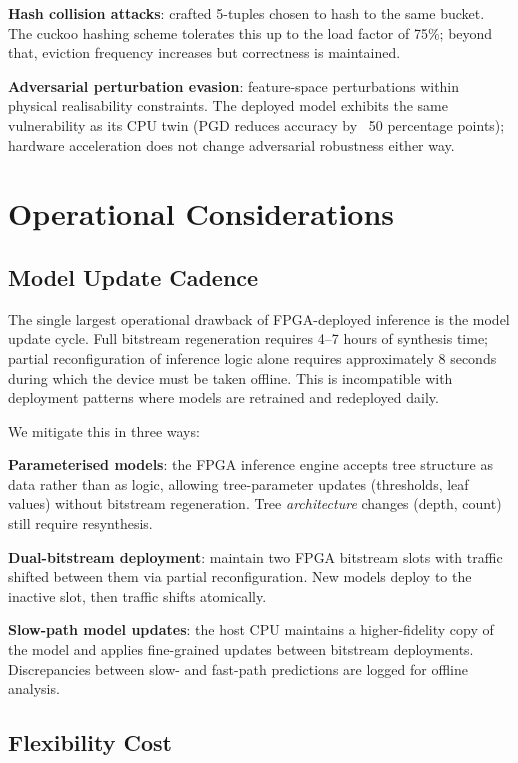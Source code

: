 \documentclass[sigconf,nonacm]{acmart}
\begin{document}
\textbf{Hash collision attacks}: crafted 5-tuples chosen to hash to
the same bucket. The cuckoo hashing scheme tolerates this up to the
load factor of 75\%; beyond that, eviction frequency increases but
correctness is maintained.

\textbf{Adversarial perturbation evasion}: feature-space perturbations
within physical realisability constraints. The deployed model exhibits
the same vulnerability as its CPU twin (PGD reduces accuracy by ~50
percentage points); hardware acceleration does not change adversarial
robustness either way.

\section{Operational Considerations}

\subsection{Model Update Cadence}

The single largest operational drawback of FPGA-deployed inference is
the model update cycle. Full bitstream regeneration requires 4--7 hours
of synthesis time; partial reconfiguration of inference logic alone
requires approximately 8 seconds during which the device must be taken
offline. This is incompatible with deployment patterns where models
are retrained and redeployed daily.

We mitigate this in three ways:

\textbf{Parameterised models}: the FPGA inference engine accepts tree
structure as data rather than as logic, allowing tree-parameter updates
(thresholds, leaf values) without bitstream regeneration. Tree
\emph{architecture} changes (depth, count) still require resynthesis.

\textbf{Dual-bitstream deployment}: maintain two FPGA bitstream slots
with traffic shifted between them via partial reconfiguration. New
models deploy to the inactive slot, then traffic shifts atomically.

\textbf{Slow-path model updates}: the host CPU maintains a higher-fidelity
copy of the model and applies fine-grained updates between bitstream
deployments. Discrepancies between slow- and fast-path predictions are
logged for offline analysis.

\subsection{Flexibility Cost}
\end{document}
